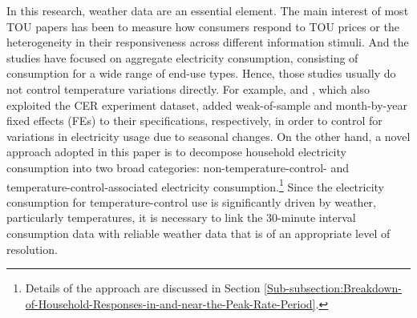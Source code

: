 In this research, weather data are an essential element. The main interest of most TOU papers has been to measure how consumers respond to TOU prices or the heterogeneity in their responsiveness across different information stimuli. And the studies have focused on aggregate electricity consumption, consisting of consumption for a wide range of end-use types. Hence, those studies usually do not control temperature variations directly. For example, \cite{The-Effect-of-Information-on-TOU-Electricity-Use:An-Irish-Residential-Study_Pon_2017} and \cite{Peaking-Interest:How-Awareness-Drives-the-Effectiveness-of-Time-of-Use-Electricity-Pricing_Prest_2020}, which also exploited the CER experiment dataset, added weak-of-sample and month-by-year fixed effects (FEs) to their specifications, respectively, in order to control for variations in electricity usage due to seasonal changes. On the other hand, a novel approach adopted in this paper is to decompose household electricity consumption into two broad categories: non-temperature-control- and temperature-control-associated electricity consumption.\footnote{Details of the approach are discussed in Section \ref{Sub-subsection:Breakdown-of-Household-Responses-in-and-near-the-Peak-Rate-Period}.} Since the electricity consumption for temperature-control use is significantly driven by weather, particularly temperatures, it is necessary to link the 30-minute interval consumption data with reliable weather data that is of an appropriate level of resolution. 

